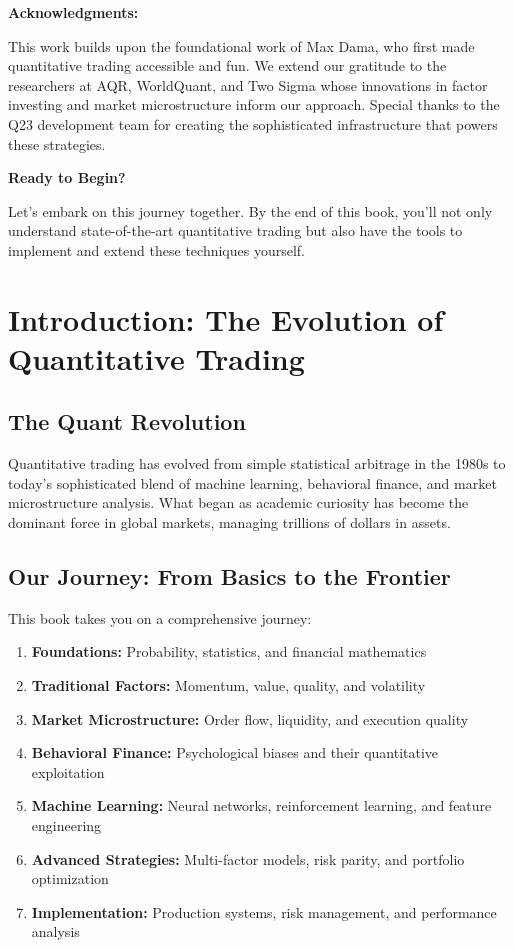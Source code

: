 \documentclass[11pt,letterpaper]{book}
\begin{document}
\textbf{Acknowledgments:}

This work builds upon the foundational work of Max Dama, who first made quantitative trading accessible and fun. We extend our gratitude to the researchers at AQR, WorldQuant, and Two Sigma whose innovations in factor investing and market microstructure inform our approach. Special thanks to the Q23 development team for creating the sophisticated infrastructure that powers these strategies.

\textbf{Ready to Begin?}

Let's embark on this journey together. By the end of this book, you'll not only understand state-of-the-art quantitative trading but also have the tools to implement and extend these techniques yourself.

\chapter{Introduction: The Evolution of Quantitative Trading}

\section{The Quant Revolution}

Quantitative trading has evolved from simple statistical arbitrage in the 1980s to today's sophisticated blend of machine learning, behavioral finance, and market microstructure analysis. What began as academic curiosity has become the dominant force in global markets, managing trillions of dollars in assets.

\section{Our Journey: From Basics to the Frontier}

This book takes you on a comprehensive journey:
\begin{enumerate}
    \item \textbf{Foundations:} Probability, statistics, and financial mathematics
    \item \textbf{Traditional Factors:} Momentum, value, quality, and volatility
    \item \textbf{Market Microstructure:} Order flow, liquidity, and execution quality
    \item \textbf{Behavioral Finance:} Psychological biases and their quantitative exploitation
    \item \textbf{Machine Learning:} Neural networks, reinforcement learning, and feature engineering
    \item \textbf{Advanced Strategies:} Multi-factor models, risk parity, and portfolio optimization
    \item \textbf{Implementation:} Production systems, risk management, and performance analysis
\end{enumerate}
\end{document}
